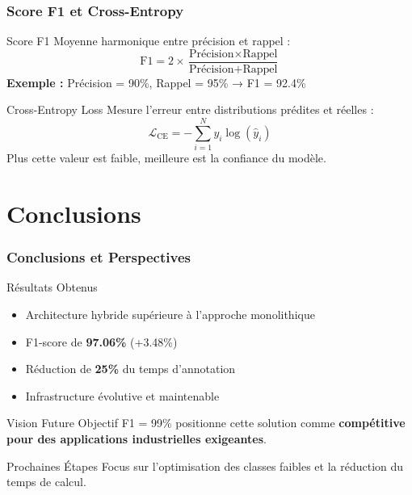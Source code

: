 \documentclass[
	11pt,
	aspectratio=169,
]{beamer}
\begin{document}

\begin{frame}
	\frametitle{Score F1 et Cross-Entropy}
	
	\begin{block}{Score F1}
		Moyenne harmonique entre précision et rappel :
		\begin{equation*}
			\text{F1} = 2 \times \frac{\text{Précision} \times \text{Rappel}}{\text{Précision} + \text{Rappel}}
		\end{equation*}
		\textbf{Exemple :} Précision = 90\%, Rappel = 95\% → F1 = 92.4\%
	\end{block}
	
	\bigskip
	
	\begin{block}{Cross-Entropy Loss}
		Mesure l'erreur entre distributions prédites et réelles :
		\begin{equation*}
			\mathcal{L}_{\text{CE}} = -\sum_{i=1}^{N} y_i \log(\hat{y}_i)
		\end{equation*}
		Plus cette valeur est faible, meilleure est la confiance du modèle.
	\end{block}
\end{frame}


\section{Conclusions}

\begin{frame}
	\frametitle{Conclusions et Perspectives}
	
	\begin{block}{Résultats Obtenus}
		\begin{itemize}
			\item Architecture hybride \alert{supérieure} à l'approche monolithique
			\item F1-score de \textbf{97.06\%} (+3.48\%)
			\item Réduction de \textbf{25\%} du temps d'annotation
			\item Infrastructure évolutive et maintenable
		\end{itemize}
	\end{block}
	
	\bigskip
	
	\begin{exampleblock}{Vision Future}
		Objectif F1 = 99\% positionne cette solution comme
		\textbf{compétitive pour des applications industrielles exigeantes}.
	\end{exampleblock}
	
	\bigskip
	
	\begin{alertblock}{Prochaines Étapes}
		Focus sur l'optimisation des classes faibles et la réduction du temps de calcul.
	\end{alertblock}
\end{frame}
\end{document}
